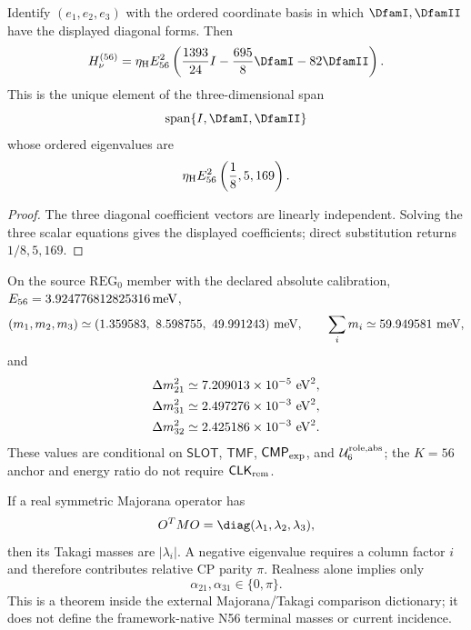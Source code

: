 \documentclass[12pt,a4paper]{article}
\newcommand{\CLKrem}{\mathsf{CLK}_{\rm rem}}
\newcommand{\Uroleabs}{\mathcal U_6^{\rm role,abs}}
\newcommand{\CMPexp}{\mathsf{CMP}_{\rm exp}}
\newcommand{\etaH}{\eta_{\rm H}}
\begin{document}
\begin{proposition}
\label{p6:prop:radical-affine-encoding}
Identify \((e_1,e_2,e_3)\) with the ordered coordinate basis in which
\(\DfamI,\DfamII\) have the displayed diagonal forms.  Then
\[
H_\nu^{(56)}
=
\etaH E_{56}^2
\left(
\frac{1393}{24}I
-\frac{695}{8}\DfamI
-82\DfamII
\right).
\]
This is the unique element of the three-dimensional span
\[
\operatorname{span}\{I,\DfamI,\DfamII\}
\]
whose ordered eigenvalues are
\[
\etaH E_{56}^2\left(\frac18,5,169\right).
\]
\end{proposition}

\begin{proof}
The three diagonal coefficient vectors are linearly independent.  Solving
the three scalar equations gives the displayed coefficients; direct
substitution returns \(1/8,5,169\).
\end{proof}

\begin{corollary}
\label{p6:cor:neutral-numerical-packet}
On the source \(\mathrm{REG}_0\) member with the declared absolute calibration,
\(E_{56}=3.924776812825316\,{\rm meV}\),
\[
(m_1,m_2,m_3)
\simeq
(1.359583,\ 8.598755,\ 49.991243)\ {\rm meV},
\qquad
\sum_i m_i\simeq59.949581\ {\rm meV},
\]
and
\[
\begin{aligned}
\Delta m_{21}^2&\simeq7.209013\times10^{-5}\ {\rm eV}^2,\\
\Delta m_{31}^2&\simeq2.497276\times10^{-3}\ {\rm eV}^2,\\
\Delta m_{32}^2&\simeq2.425186\times10^{-3}\ {\rm eV}^2.
\end{aligned}
\]
These values are conditional on \(\mathsf{SLOT}\), \(\mathsf{TMF}\),
\(\CMPexp\), and \(\Uroleabs\); the \(K=56\) anchor and energy ratio do not
require \(\CLKrem\).
\end{corollary}

\begin{theorem}
\label{p6:thm:majorana-signs}
If a real symmetric Majorana operator has
\[
O^TMO=\diag(\lambda_1,\lambda_2,\lambda_3),
\]
then its Takagi masses are \(|\lambda_i|\).  A negative eigenvalue requires a
column factor \(i\) and therefore contributes relative CP parity \(\pi\).
Realness alone implies only
\[
\alpha_{21},\alpha_{31}\in\{0,\pi\}.
\]
This is a theorem inside the external Majorana/Takagi comparison dictionary; it does not define the framework-native N56 terminal masses or current incidence.
\end{theorem}
\end{document}
